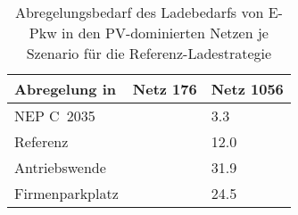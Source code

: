 {
\renewcommand{\arraystretch}{1.2}%
\begin{table}[H]
	\begin{center}
		\caption{Abregelungsbedarf des Ladebedarfs von E-Pkw in den PV-dominierten Netzen je Szenario für die Referenz-Ladestrategie}
		\begin{tabu} to 0.6\textwidth {X[1.5] X[1, r] X[1, r]}
			\toprule
			Abregelung in \si{\mwh} 			 & Netz \num{176} & Netz \num{1056} \\ \midrule
			NEP C~\num{2035}                     &                & \num{3.3}       \\
			Referenz                             &                & \num{12.0}      \\
			Antriebswende                        &                & \num{31.9}      \\
			\glqq Firmenparkplatz\grqq{}         &                & \num{24.5}      \\ \bottomrule
		\end{tabu}
		\label{tab:pv_dominated_week_a_epkw_cur}
	\end{center}
	\vspace{-3mm}%
\end{table}
}